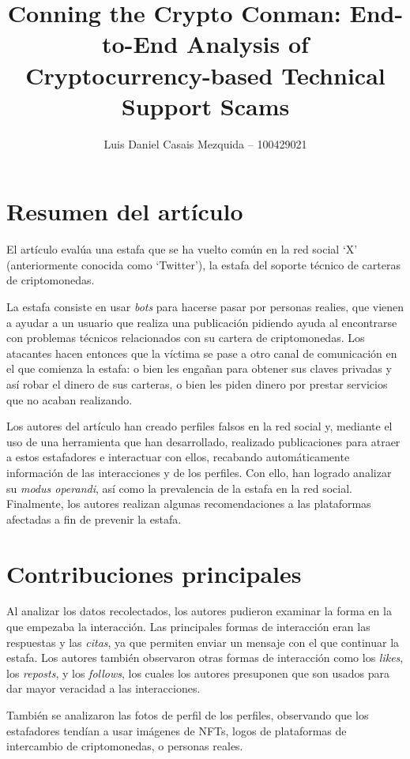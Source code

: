 \documentclass[es]{uc3mreport}
\author{Luis Daniel Casais Mezquida -- 100429021}
\title{Conning the Crypto Conman: End-to-End Analysis of Cryptocurrency-based Technical Support Scams}
\begin{document}
    \makecover

    \begin{report}
        \section{Resumen del artículo}
        El artículo evalúa una estafa que se ha vuelto común en la red social `X' (anteriormente conocida como `Twitter'), la estafa del soporte técnico de carteras de criptomonedas.

        La estafa consiste en usar \textit{bots} para hacerse pasar por personas realies, que vienen a ayudar a un usuario que realiza una publicación pidiendo ayuda al encontrarse con problemas técnicos relacionados con su cartera de criptomonedas. Los atacantes hacen entonces que la víctima se pase a otro canal de comunicación en el que comienza la estafa: o bien les engañan para obtener sus claves privadas y así robar el dinero de sus carteras, o bien les piden dinero por prestar servicios que no acaban realizando.

        Los autores del artículo han creado perfiles falsos en la red social y, mediante el uso de una herramienta que han desarrollado, realizado publicaciones para atraer a estos estafadores e interactuar con ellos, recabando automáticamente información de las interacciones y de los perfiles. Con ello, han logrado analizar su \textit{modus operandi}, así como la prevalencia de la estafa en la red social. Finalmente, los autores realizan algunas recomendaciones a las plataformas afectadas a fin de prevenir la estafa.


        \section{Contribuciones principales}
        Al analizar los datos recolectados, los autores pudieron examinar la forma en la que empezaba la interacción. Las principales formas de interacción eran las respuestas y las \textit{citas}, ya que permiten enviar un mensaje con el que continuar la estafa. Los autores también observaron otras formas de interacción como los \textit{likes}, los \textit{reposts}, y los \textit{follows}, los cuales los autores presuponen que son usados para dar mayor veracidad a las interacciones.

        También se analizaron las fotos de perfil de los perfiles, observando que los estafadores tendían a usar imágenes de NFTs, logos de plataformas de intercambio de criptomonedas, o personas reales.


\end{report}
\end{document}
